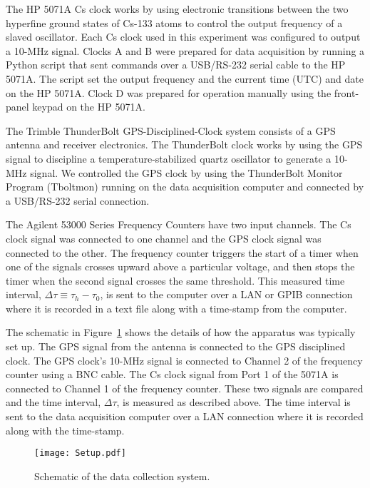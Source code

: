 \documentclass[prb,preprint]{revtex4-1}
\begin{document}
The HP 5071A Cs clock works by using electronic transitions between the two hyperfine ground states of Cs-133 atoms to control the output frequency of a slaved oscillator. Each Cs clock used in this experiment was configured to output a 10-MHz signal. Clocks A and B were prepared for data acquisition by running a Python script that sent commands over a USB/RS-232 serial cable to the HP 5071A.  The script set the output frequency and the current time (UTC) and date on the HP 5071A. Clock D was prepared for operation manually using the front-panel keypad on the HP 5071A. 

The Trimble ThunderBolt GPS-Disciplined-Clock system consists of a GPS antenna and receiver electronics. The ThunderBolt clock works by using the GPS signal to discipline a temperature-stabilized quartz oscillator to generate a 10-MHz signal. We controlled the GPS clock by using the ThunderBolt Monitor Program (Tboltmon) running on the data acquisition computer and connected by a USB/RS-232 serial connection.  

The Agilent 53000 Series Frequency Counters have two input channels. The Cs clock signal was connected to one channel and the GPS clock signal was connected to the other. The frequency counter triggers the start of a timer when one of the signals crosses upward above a particular voltage, and then stops the timer when the second signal crosses the same threshold.  This measured time interval, $\Delta \tau\equiv \tau_h - \tau_0$, is sent to the computer over a LAN or GPIB connection where it is recorded in a text file along with a time-stamp from the computer. 

The schematic in Figure~\ref{fig:setup} shows the details of how the apparatus was typically set up. The GPS signal from the antenna is connected to the GPS disciplined clock. The GPS clock's 10-MHz signal is connected to Channel 2 of the frequency counter using a BNC cable. The Cs clock signal from Port 1 of the 5071A is connected to Channel 1 of the frequency counter. These two signals are compared and the time interval, $\Delta \tau $, is measured as described above. The time interval is sent to the data acquisition computer over a LAN connection where it is recorded along with the time-stamp.
\begin{figure}[ht!] 
\centering
\texttt{[image: Setup.pdf]}
\caption{Schematic of the data collection system.}
\label{fig:setup}
\end{figure}
\end{document}
